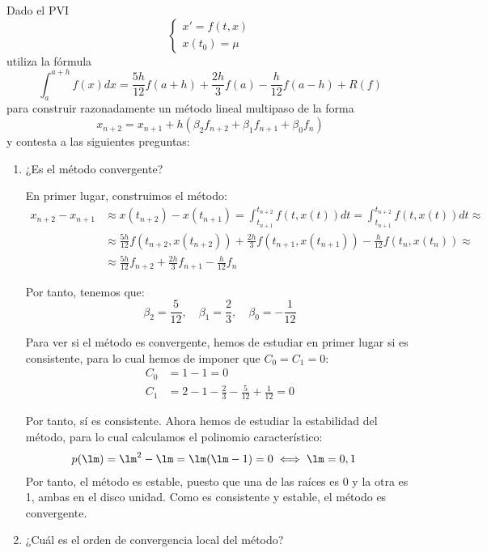 \begin{ejercicio}
    Dado el PVI
    \begin{equation*}
        \begin{cases}
            x' = f(t, x) \\
            x(t_0) = \mu
        \end{cases}
    \end{equation*}
    utiliza la fórmula
    \begin{equation*}
        \int_a^{a+h} f(x)dx = \frac{5h}{12} f(a + h) + \frac{2h}{3} f(a) - \frac{h}{12} f(a - h) + R(f)
    \end{equation*}
    para construir razonadamente un método lineal multipaso de la forma
    \begin{equation*}
        x_{n+2} = x_{n+1} + h(\beta_2 f_{n+2} + \beta_1 f_{n+1} + \beta_0 f_n)
    \end{equation*}
    y contesta a las siguientes preguntas:
    \begin{enumerate}
        \item ¿Es el método convergente?
        
        En primer lugar, construimos el método:
        \begin{align*}
            x_{n+2} - x_{n+1} &\approx x(t_{n+2}) - x(t_{n+1}) = \int_{t_{n+1}}^{t_{n+2}} f(t, x(t))dt = \int_{t_{n+1}}^{t_{n+2}} f(t, x(t))dt
            \approx \\& \approx \frac{5h}{12} f(t_{n+2}, x(t_{n+2})) + \frac{2h}{3} f(t_{n+1}, x(t_{n+1})) - \frac{h}{12} f(t_n, x(t_n))
            \approx \\&\approx \frac{5h}{12} f_{n+2} + \frac{2h}{3} f_{n+1} - \frac{h}{12} f_n
        \end{align*}

        Por tanto, tenemos que:
        \begin{equation*}
            \beta_2 = \frac{5}{12}, \quad \beta_1 = \frac{2}{3}, \quad \beta_0 = -\frac{1}{12}
        \end{equation*}

        Para ver si el método es convergente, hemos de estudiar en primer lugar si es consistente, para lo cual hemos de imponer que $C_0=C_1=0$:
        \begin{align*}
            C_0 &= 1 - 1 = 0\\
            C_1 &= 2 - 1 - \frac{2}{3} - \frac{5}{12} + \frac{1}{12} = 0
        \end{align*}

        Por tanto, sí es consistente. Ahora hemos de estudiar la estabilidad del método, para lo cual calculamos el polinomio característico:
        \begin{align*}
            p(\lm) &= \lm^2 - \lm = \lm(\lm - 1) = 0\iff \lm = 0, 1
        \end{align*}
        Por tanto, el método es estable, puesto que una de las raíces es 0 y la otra es 1, ambas en el disco unidad. Como es consistente y estable, el método es convergente.
        \item ¿Cuál es el orden de convergencia local del método?
        

\end{enumerate}
\end{ejercicio}
